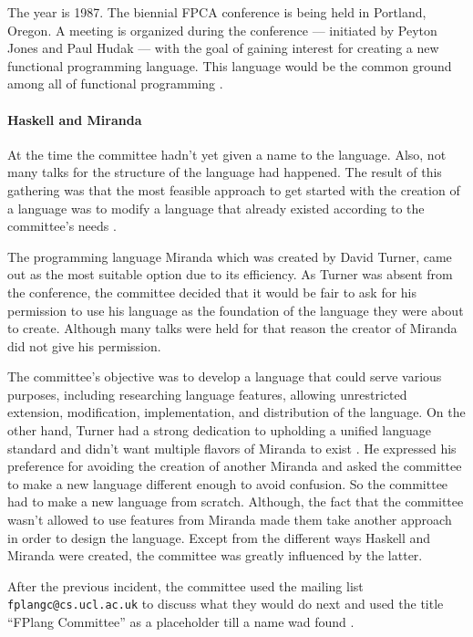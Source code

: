 \documentclass[a4paper, titlepage, twoside]{article}
\begin{document}
The year is 1987. The biennial FPCA conference is being held in Portland, Oregon. A meeting is organized during the conference --- initiated by Peyton Jones and Paul Hudak --- with the goal of gaining interest for creating a new functional programming language. This language would be the common ground among all of functional programming \autocite{hudakHistoryHaskellBeing2007}.

\paragraph*{Haskell and Miranda}
\label{sec:org51bbaa0}

At the time the committee hadn't yet given a name to the language. Also, not many talks for the structure of the
language had happened. The result of this gathering was that the most feasible approach to get started with the creation of a language was to modify a language that already existed according to the committee's needs .

The programming language Miranda \autocite{turnerMirandaNonstrictFunctional1985} which was created by David Turner, came out as the most suitable option due to its efficiency. As Turner was absent from the conference, the committee decided that it would be fair to ask for his permission to use his language as the foundation of the language they were about to create. Although many talks were held for that reason the creator of Miranda did not give his permission. 

The committee's objective was to develop a language that could serve various purposes, including researching language features, allowing unrestricted extension, modification, implementation, and distribution of the language. On the other hand, Turner had a strong dedication to upholding a unified language standard and didn't want multiple flavors of Miranda to exist \autocite{hudakHistoryHaskellBeing2007}. He expressed his preference for avoiding the creation of another Miranda and asked the committee to make a new language different enough to avoid confusion. So the committee had to make a new language from scratch. Although, the fact that the committee wasn't allowed to use features from Miranda made them take another approach in order to design the language. Except from the different ways Haskell and Miranda were created, the committee was greatly influenced by the latter.

After the previous incident, the committee used the mailing list \texttt{fplangc@cs.ucl.ac.uk} to discuss what they would do next and used the title ``FPlang Committee'' as a placeholder till a name wad found \autocite{hudakHistoryHaskellBeing2007}.
\end{document}
